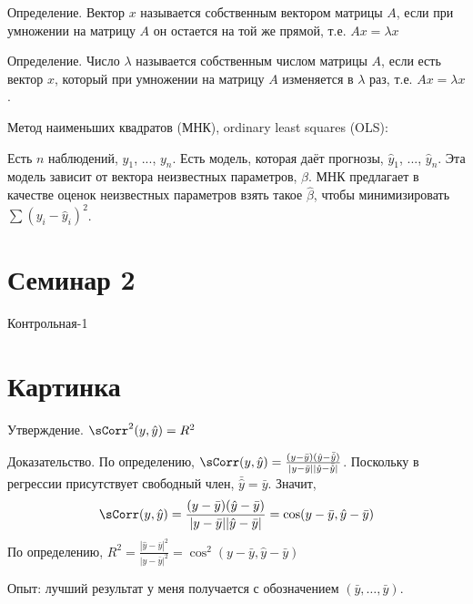 \documentclass[pdftex,12pt,a4paper]{article}
\def \hb{\hat{\beta}}
\def \hy{\hat{y}}
\begin{document}
Определение. Вектор $x$ называется собственным вектором матрицы $A$, если при умножении на матрицу $A$ он остается на той же прямой, т.е. $Ax=\lambda x$


Определение. Число $\lambda$ называется собственным числом матрицы $A$, если есть вектор $x$, который при умножении на матрицу $A$ изменяется в $\lambda$ раз, т.е. $Ax=\lambda x$.




Метод наименьших квадратов (МНК), ordinary least squares (OLS):


Есть $n$ наблюдений, $y_1$, ..., $y_n$. Есть модель, которая даёт прогнозы, $\hat{y}_1$, ..., $\hat{y}_n$. Эта модель зависит от вектора неизвестных параметров, $\beta$. МНК предлагает в качестве оценок неизвестных параметров взять такое $\hb$, чтобы минимизировать $\sum (y_i-\hat{y}_i)^2$.

\section{Семинар 2}

Контрольная-1

\section{Картинка}


Утверждение. $\sCorr^2(y,\hy)=R^2$

Доказательство. По определению, $\sCorr(y,\hy)=\frac{(y-\bar{y})(\hy-\bar{\hy})}{|y-\bar{y}||\hy-\bar{\hy}|}$. Поскольку в регрессии присутствует свободный член, $\bar{\hy}=\bar{y}$. Значит, 
\begin{equation}
\sCorr(y,\hy)=\frac{(y-\bar{y})(\hy-\bar{y})}{|y-\bar{y}||\hy-\bar{y}|}=\cos(y-\bar{y},\hy-\bar{y})
\end{equation}
По определению, $R^2=\frac{|\hy-\bar{y}|^2}{|y-\bar{y}|^2}=\cos^2(y-\bar{y},\hy-\bar{y})$



Опыт: лучший результат у меня получается с обозначением $(\bar{y},\ldots,\bar{y})$.
\end{document}
